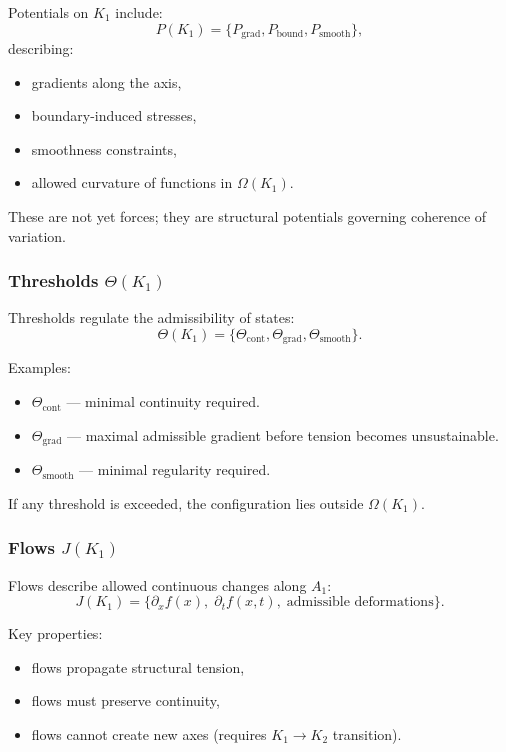 Potentials on $K_1$ include:
\[
P(K_1) = \{ P_{\mathrm{grad}}, P_{\mathrm{bound}}, P_{\mathrm{smooth}} \},
\]
describing:
\begin{itemize}
    \item gradients along the axis,
    \item boundary-induced stresses,
    \item smoothness constraints,
    \item allowed curvature of functions in $\Omega(K_1)$.
\end{itemize}

These are not yet forces; they are structural potentials governing
coherence of variation.

\subsubsection{Thresholds \texorpdfstring{$\Theta(K_1)$}{\Theta(K_1)}}

Thresholds regulate the admissibility of states:
\[
\Theta(K_1) = \{ \Theta_{\mathrm{cont}}, \Theta_{\mathrm{grad}},
                 \Theta_{\mathrm{smooth}} \}.
\]

Examples:
\begin{itemize}
    \item $\Theta_{\mathrm{cont}}$ — minimal continuity required.
    \item $\Theta_{\mathrm{grad}}$ — maximal admissible gradient before
          tension becomes unsustainable.
    \item $\Theta_{\mathrm{smooth}}$ — minimal regularity required.
\end{itemize}

If any threshold is exceeded, the configuration lies outside
$\Omega(K_1)$.

\subsubsection{Flows \texorpdfstring{$J(K_1)$}{J(K_1)}}

Flows describe allowed continuous changes along $A_1$:
\[
J(K_1) = \{ \partial_x f(x),\; \partial_t f(x,t),\; \text{admissible deformations} \}.
\]

Key properties:
\begin{itemize}
    \item flows propagate structural tension,
    \item flows must preserve continuity,
    \item flows cannot create new axes (requires $K_1\to K_2$ transition).
\end{itemize}

